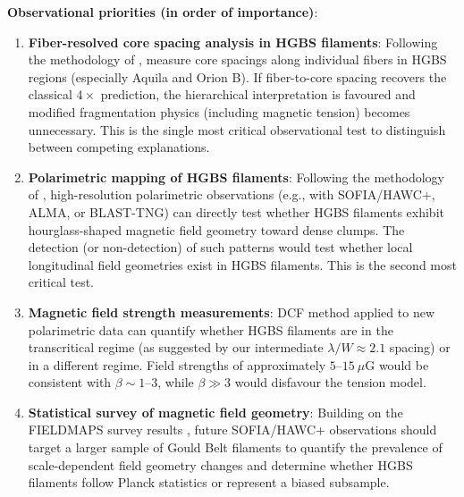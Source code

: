 \documentclass[11pt,a4paper]{article}
\begin{document}
\textbf{Observational priorities (in order of importance)}:
\begin{enumerate}
    \item \textbf{Fiber-resolved core spacing analysis in HGBS filaments}: Following the methodology of \citet{Yang2024}, measure core spacings along individual fibers in HGBS regions (especially Aquila and Orion B). If fiber-to-core spacing recovers the classical $4\times$ prediction, the hierarchical interpretation is favoured and modified fragmentation physics (including magnetic tension) becomes unnecessary. This is the single most critical observational test to distinguish between competing explanations.

    \item \textbf{Polarimetric mapping of HGBS filaments}: Following the methodology of \citet{Jadhav2026}, high-resolution polarimetric observations (e.g., with SOFIA/HAWC+, ALMA, or BLAST-TNG) can directly test whether HGBS filaments exhibit hourglass-shaped magnetic field geometry toward dense clumps. The detection (or non-detection) of such patterns would test whether local longitudinal field geometries exist in HGBS filaments. This is the second most critical test.

    \item \textbf{Magnetic field strength measurements}: DCF method applied to new polarimetric data can quantify whether HGBS filaments are in the transcritical regime (as suggested by our intermediate $\lambda/W \approx 2.1$ spacing) or in a different regime. Field strengths of approximately $5$--$15~\mu$G would be consistent with $\beta \sim 1$--$3$, while $\beta \gg 3$ would disfavour the tension model.

    \item \textbf{Statistical survey of magnetic field geometry}: Building on the FIELDMAPS survey results \citep{Coude2025}, future SOFIA/HAWC+ observations should target a larger sample of Gould Belt filaments to quantify the prevalence of scale-dependent field geometry changes and determine whether HGBS filaments follow Planck statistics or represent a biased subsample.
\end{enumerate}
\end{document}
